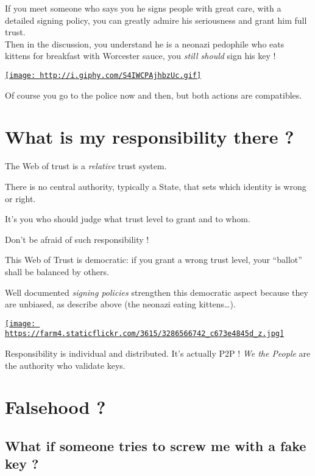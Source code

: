 If you meet someone who says you he signs people with great care, with a
detailed signing policy, you can greatly admire his seriousness and
grant him full trust.\\Then in the discussion, you understand he is a
neonazi pedophile who eats kittens for breakfast with Worcester sauce,
you \emph{still should} sign his key !

\href{http://giphy.com/gifs/cat-black-and-white-food-S4IWCPAjhbzUc}{\texttt{[image: http://i.giphy.com/S4IWCPAjhbzUc.gif]}}

Of course you go to the police now and then, but both actions are
compatibles.

\section{What is my responsibility there ?}\label{what-is-my-responsibility-there}

The Web of trust is a \emph{relative} trust system.

There is no central authority, typically a State, that sets which
identity is wrong or right.

It's you who should judge what trust level to grant and to whom.

Don't be afraid of such responsibility !

This Web of Trust is democratic: if you grant a wrong trust level, your
``ballot'' shall be balanced by others.

Well documented \emph{signing policies} strengthen this democratic
aspect because they are unbiased, as describe above (the neonazi eating
kittens\ldots{}).

\href{https://www.flickr.com/photos/jmtimages/3286566742/}{\texttt{[image: https://farm4.staticflickr.com/3615/3286566742\_c673e4845d\_z.jpg]}}

Responsibility is individual and distributed. It's actually P2P !
\emph{We the People} are the authority who validate keys.

\section{Falsehood ?}\label{falsehood}

\subsection{What if someone tries to screw me with a fake key ?}\label{what-if-someone-tries-to-screw-me-with-a-fake-key}

